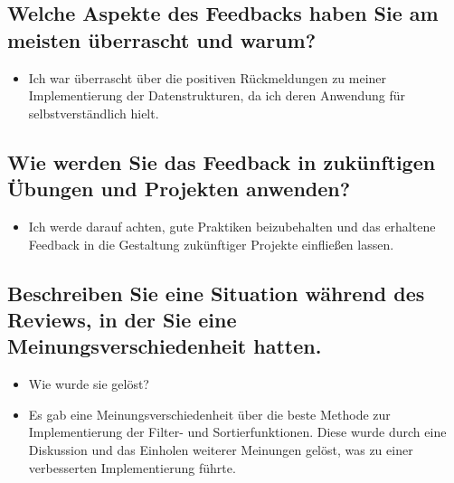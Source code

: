 \documentclass[a4paper,11pt]{article}
\begin{document}
\subsection*{Welche Aspekte des Feedbacks haben Sie am meisten überrascht und warum?}
\begin{itemize}
    \item Ich war überrascht über die positiven Rückmeldungen zu meiner Implementierung der Datenstrukturen, da ich deren Anwendung für selbstverständlich hielt.
\end{itemize}

\subsection*{Wie werden Sie das Feedback in zukünftigen Übungen und Projekten anwenden?}
\begin{itemize}
    \item Ich werde darauf achten, gute Praktiken beizubehalten und das erhaltene Feedback in die Gestaltung zukünftiger Projekte einfließen lassen.
\end{itemize}

\subsection*{Beschreiben Sie eine Situation während des Reviews, in der Sie eine Meinungsverschiedenheit hatten.}
\begin{itemize}
    \item Wie wurde sie gelöst?
    \item Es gab eine Meinungsverschiedenheit über die beste Methode zur Implementierung der Filter- und Sortierfunktionen. Diese wurde durch eine Diskussion und das Einholen weiterer Meinungen gelöst, was zu einer verbesserten Implementierung führte.
\end{itemize}
\end{document}
